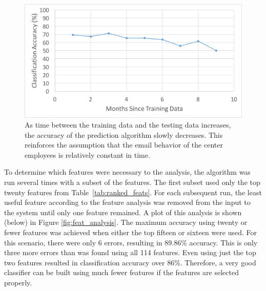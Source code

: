 \documentclass[12pt]{report}
\begin{document}
\begin{figure}[t]
    \centering
        \includegraphics[width=.8\columnwidth,trim={0mm 0mm 0mm 0mm},clip]{TimeGapsAnalysis}
        \vspace{-7pt}
        \caption[Accuracy of classification over time]{As time between the training data and the testing data increases, the accuracy of the prediction algorithm slowly decreases.  This reinforces the assumption that the email behavior of the center employees is relatively constant in time.}
        \label{fig:time_analysis}
\end{figure}

To determine which features were necessary to the analysis, the algorithm was run several times with a subset of the features.
The first subset used only the top twenty features from Table~\ref{tab:ranked_feats}.
For each subsequent run, the least useful feature according to the feature analysis was removed from the input to the system until only one feature remained.
A plot of this analysis is shown (below) in Figure \ref{fig:feat_analysis}.
The maximum accuracy using twenty or fewer features was achieved when either the top fifteen or sixteen were used.
For this scenario, there were only 6 errors, resulting in 89.86\% accuracy.
This is only three more errors than was found using all 114 features.
Even using just the top two features resulted in classification accuracy over 86\%.
Therefore, a very good classifier can be built using much fewer features if the features are selected properly.
\end{document}
